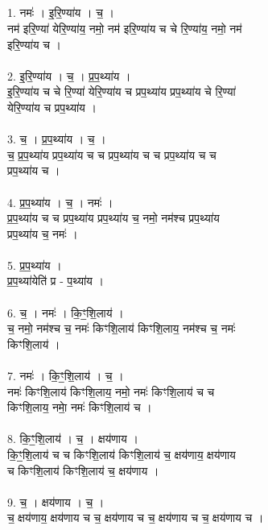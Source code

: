 \subsection{}
1. नमः॑ । इ॒रि॒ण्या॑य । च॒ ।\\
नम॑ इरि॒ण्या॑ येरि॒ण्या॑य॒ नमो॒ नम॑ इरि॒ण्या॑य च चे रि॒ण्या॑य॒ नमो॒ नम॑\\
इरि॒ण्या॑य च ।\\
\\
2. इ॒रि॒ण्या॑य । च॒ । प्र॒प॒थ्या॑य ।\\
इ॒रि॒ण्या॑य च चे रि॒ण्या॑ येरि॒ण्या॑य च प्रप॒थ्या॑य प्रप॒थ्या॑य चे रि॒ण्या॑\\
येरि॒ण्या॑य च प्रप॒थ्या॑य ।\\
\\
3. च॒ । प्र॒प॒थ्या॑य । च॒ ।\\
च॒ प्र॒प॒थ्या॑य प्रप॒थ्या॑य च च प्रप॒थ्या॑य च च प्रप॒थ्या॑य च च\\
प्रप॒थ्या॑य च ।\\
\\
4. प्र॒प॒थ्या॑य । च॒ । नमः॑ ।\\
प्र॒प॒थ्या॑य च च प्रप॒थ्या॑य प्रप॒थ्या॑य च॒ नमो॒ नम॑श्च प्रप॒थ्या॑य\\
प्रप॒थ्या॑य च॒ नमः॑ ।\\
\\
5. प्र॒प॒थ्या॑य ।\\
प्र॒प॒थ्या॑येति॑ प्र - प॒थ्या॑य ।\\
\\
6. च॒ । नमः॑ । कि॒ꣳ॒शि॒लाय॑ ।\\
च॒ नमो॒ नम॑श्च च॒ नमः॑ किꣳशि॒लाय॑ किꣳशि॒लाय॒ नम॑श्च च॒ नमः॑\\
किꣳशि॒लाय॑ ।\\
\\
7. नमः॑ । कि॒ꣳ॒शि॒लाय॑ । च॒ ।\\
नमः॑ किꣳशि॒लाय॑ किꣳशि॒लाय॒ नमो॒ नमः॑ किꣳशि॒लाय॑ च च\\
किꣳशि॒लाय॒ नमाे॒ नमः॑ किꣳशि॒लाय॑ च ।\\
\\
8. कि॒ꣳ॒शि॒लाय॑ । च॒ । क्षय॑णाय ।\\
कि॒ꣳ॒शि॒लाय॑ च च किꣳशि॒लाय॑ किꣳशि॒लाय॑ च॒ क्षय॑णाय॒ क्षय॑णाय\\
च किꣳशि॒लाय॑ किꣳशि॒लाय॑ च॒ क्षय॑णाय ।\\
\\
9. च॒ । क्षय॑णाय । च॒ ।\\
च॒ क्षय॑णाय॒ क्षय॑णाय च च॒ क्षय॑णाय च च॒ क्षय॑णाय च च॒ क्षय॑णाय च ।\\
\\
